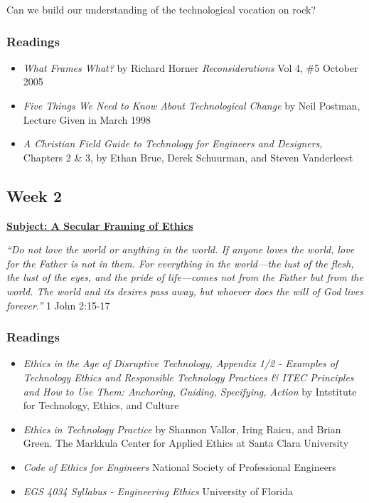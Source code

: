 \documentclass[11pt]{article}
\begin{document}
Can we build our understanding of the technological vocation on rock?
\subsubsection*{Readings}
\label{sec:org9076204}
\begin{itemize}
\item \emph{What Frames What?} by Richard Horner \emph{Reconsiderations} Vol 4, \#5 October
2005
\item \emph{Five Things We Need to Know About Technological Change} by Neil Postman,
Lecture Given in March 1998
\item \emph{A Christian Field Guide to Technology for Engineers and Designers}, Chapters
2 \& 3, by Ethan Brue, Derek Schuurman, and Steven Vanderleest
\end{itemize}
\subsection*{Week 2}
\label{sec:org53d3592}
\textbf{\uline{Subject: A Secular Framing of Ethics}}
\begin{mdframed}[nobreak=true]
\emph{``Do not love the world or anything in the world. If anyone loves the world,
love for the Father is not in them. For everything in the world—the lust
of the flesh, the lust of the eyes, and the pride of life—comes not from the
Father but from the world. The world and its desires pass away, but whoever
does the will of God lives forever.''} 1 John 2:15-17
\end{mdframed}
\subsubsection*{Readings}
\label{sec:org6966b80}
\begin{itemize}
\item \emph{Ethics in the Age of Disruptive Technology, Appendix 1/2 - Examples of
Technology Ethics and Responsible Technology Practices \& ITEC Principles and
How to Use Them: Anchoring, Guiding, Specifying, Action} by Intstitute for
Technology, Ethics, and Culture
\item \emph{Ethics in Technology Practice} by Shannon Vallor, Iring Raicu, and Brian
Green. The Markkula Center for Applied Ethics at Santa Clara University
\item \emph{Code of Ethics for Engineers} National Society of Professional Engineers
\item \emph{EGS 4034 Syllabus - Engineering Ethics} University of Florida
\end{itemize}
\end{document}
